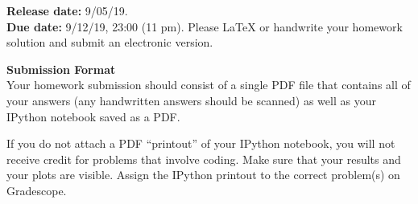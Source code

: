 

\def\title{Homework 1}

\newcommand{\qitem}{\qpart\item}

\renewcommand{\labelenumi}{(\alph{enumi})} %
\renewcommand{\theenumi}{(\alph{enumi})} %
\renewcommand{\labelenumii}{\roman{enumii}.} %
\renewcommand{\theenumii}{\roman{enumii}.}

\maketitle






\noindent
{\bf Release date:} 9/05/19.\\
{\bf Due date:}  9/12/19, 23:00 (11 pm). Please \LaTeX{} or handwrite your homework solution and submit an electronic version. 

\textbf{Submission Format} \\
Your homework submission should consist of a single PDF file that contains all of your answers (any handwritten answers should be scanned) as well as your IPython notebook saved as a PDF.
			
If you do not attach a PDF ``printout'' of your IPython notebook, you will not receive credit for problems that involve coding. Make sure that your results and your plots are visible. Assign the IPython printout to the correct problem(s) on Gradescope.

\begin{qunlist}

\newpage

\newpage

\newpage

\newpage



\end{qunlist}

